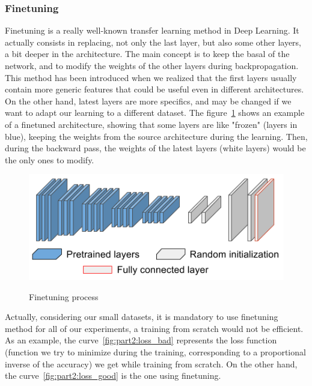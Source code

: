 \subsubsection{Finetuning}
Finetuning is a really well-known transfer learning method in Deep Learning. It actually consists in replacing, not only the last layer, but also some other layers, a bit deeper in the architecture. The main concept is to keep the basal of the network, and to modify the weights of the other layers during backpropagation. This method has been introduced when we realized that the first layers usually contain more generic features that could be useful even in different architectures. On the other hand, latest layers are more specifics, and may be changed if we want to adapt our learning to a different dataset. The figure~\ref{fig:part2:finetuning} shows an example of a finetuned architecture, showing that some layers are like "frozen" (layers in blue), keeping the weights from the source architecture during the learning. Then, during the backward pass, the weights of the latest layers (white layers) would be the only ones to modify.

\begin{figure}[ht!]
  \includegraphics[width=0.8\linewidth,center]{images/part2/finetuning.png}
  \caption{Finetuning process}\textbf{
  \label{fig:part2:finetuning}}
\end{figure}

Actually, considering our small datasets, it is mandatory to use finetuning method for all of our experiments, a training from scratch would not be efficient. As an example, the curve~\ref{fig:part2:loss_bad} represents the loss function (function we try to minimize during the training, corresponding to a proportional inverse of the accuracy) we get while training from scratch. On the other hand, the curve~\ref{fig:part2:loss_good} is the one using finetuning.

